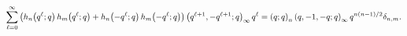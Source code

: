 \[\sum_{\ell=0}^{\infty}\left(\mathop{h_{n}\/}\nolimits\!\left(q^{\ell};q\right)%
\mathop{h_{m}\/}\nolimits\!\left(q^{\ell};q\right)+\mathop{h_{n}\/}\nolimits\!%
\left(-q^{\ell};q\right)\mathop{h_{m}\/}\nolimits\!\left(-q^{\ell};q\right)%
\right)\*\left(q^{\ell+1},-q^{\ell+1};q\right)_{\infty}q^{\ell}=\left(q;q%
\right)_{n}\left({q,-1,-q};q\right)_{\infty}q^{n(n-1)/2}\delta_{n,m}.\]
